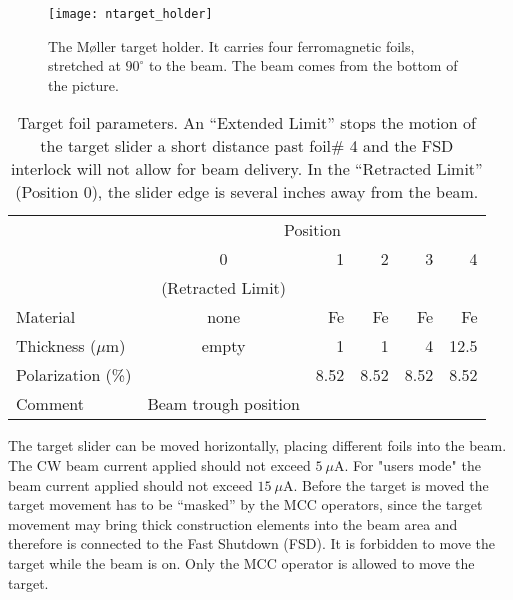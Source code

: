 {{  \begin{figure}[hbt]
      \begin{center}
          \texttt{[image: ntarget\_holder]}
      \end{center}
      \caption[M{\o}ller:target foils]{The M{\o}ller target holder. It carries
            four ferromagnetic foils, stretched at $90^\circ$ to the beam. The beam comes from the
            bottom of the picture.
            }
      \label{fig:moller_targ_rail} 
   \end{figure}  

\begin{table}[htb]
\begin{center}
\begin{tabular}{|l|c|r|r|r|r|} \hline
          & \multicolumn{5}{c|}{Position} \\ \cline{2-6}
          & 0               &  1  &  2  &  3   &  4   \\
          &  (Retracted Limit) &     &     &      &      \\
\hline 
  Material            & none & Fe & Fe & Fe & Fe \\
  Thickness ($\mu$m)   &  empty    & 1   &  1   & 4   & 12.5   \\
  Polarization (\%)      &           & 8.52 & 8.52 & 8.52 & 8.52 \\
  Comment             &  Beam  trough position &        &        &        &    \\
\hline
\end{tabular}
\end{center}
\caption[Moller target foils]{Target foil parameters. An ``Extended Limit'' stops the motion
of the target slider a short distance past foil\# 4 and the FSD interlock will not allow
for beam delivery. In the ``Retracted Limit'' (Position 0), the slider edge is several
inches away from the beam.}
\label{tab:moller-foils}
\end{table}
} %




\begin{safetyen}{0}{0}
The target slider can be moved horizontally, placing different foils
into the beam. The CW beam current applied should not exceed $5~\mu$A. For "users mode" the 
beam current applied should not exceed $15~\mu$A. Before the target is moved the target
movement has to be ``masked'' by the MCC operators, since the target
movement may bring thick construction elements into the beam area
and therefore is connected to the Fast Shutdown (FSD). It is forbidden to move
the target  while the beam is on. Only the MCC operator is allowed to move the target.


\end{safetyen}}
